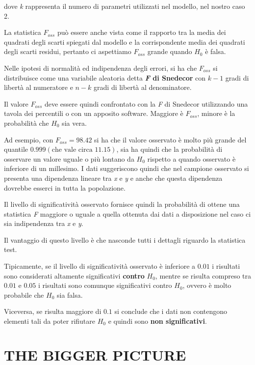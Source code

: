 dove \textit{k} rappresenta il numero di parametri utilizzati nel modello, nel nostro caso 2.

La statistica $ F_{oss}  $ può essere anche vista come il rapporto tra la media dei quadrati degli scarti spiegati dal modello e la corrispondente media dei quadrati degli scarti residui, pertanto ci aspettiamo $ F_{oss}  $ grande quando $ H_0 $ è falsa.

Nelle ipotesi di normalità ed indipendenza degli errori, si ha che $ F_{oss} $ si distribuisce come una variabile aleatoria detta \textbf{\textit{F} di Snedecor} con $ k-1 $ gradi di libertà al numeratore e $ n-k $ gradi di libertà al denominatore.

Il valore $ F_{oss} $ deve essere quindi confrontato con la \textit{F} di Snedecor utilizzando una tavola dei percentili o con un apposito software. Maggiore è $ F_{oss} $, minore è la probabilità che $ H_0 $ sia vera.

Ad esempio, con $ F_{oss}  = 98.42 $ si ha che il valore osservato è molto più grande del quantile $ 0.999 (\text{che vale circa } 11.15)$, sia ha quindi che la probabilità di osservare un valore uguale o più lontano da $ H_0 $ rispetto a quando osservato è inferiore di un millesimo.
I dati suggeriscono quindi che nel campione osservato si presenta una dipendenza lineare tra \textit{x} e \textit{y} e anche che questa dipendenza dovrebbe esserci in tutta la popolazione.

Il livello di significatività osservato fornisce quindi la probabilità di ottene una statistica \textit{F} maggiore o uguale a quella ottenuta dai dati a disposizione nel caso ci sia indipendenza tra \textit{x} e \textit{y}.

Il vantaggio di questo livello è che nasconde tutti i dettagli riguardo la statistica test.

Tipicamente, se il livello di significatività osservato è inferiore a $ 0.01 $ i risultati sono considerati altamente significativi \textbf{contro} $ H_0 $, mentre se risulta compreso tra $ 0.01 $ e $ 0.05 $ i risultati sono comunque significativi contro $ H_0 $, ovvero è molto probabile che $ H_0 $ sia falsa.

Viceversa, se risulta maggiore di $ 0.1 $ si conclude che i dati non contengono elementi tali da poter rifiutare $ H_0 $ e quindi sono \textbf{non significativi}.

\section{THE BIGGER PICTURE}

